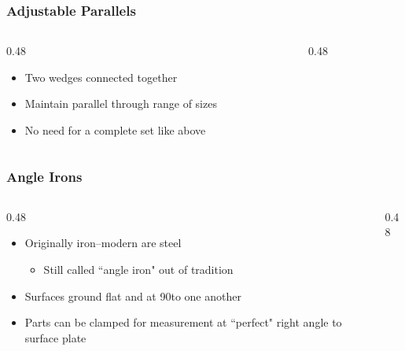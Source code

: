 \begin{frame}
	\frametitle{Adjustable Parallels}

    \begin{columns}
        \begin{column}{0.48\linewidth}
            \begin{itemize}[<+- | alert@+>]
                \item Two wedges connected together
                \item Maintain parallel through range of sizes
                \item No need for a complete set like above
            \end{itemize}
        \end{column}
        \begin{column}{0.48\linewidth}
            \resizebox{\linewidth}{!}{
                
            }
        \end{column}
    \end{columns}
\end{frame}

\begin{frame}
	\frametitle{Angle Irons}

    \begin{columns}
        \begin{column}{0.48\linewidth}
            \begin{itemize}[<+- | alert@+>]
                \item Originally iron--modern are steel
                    \begin{itemize}
                        \item Still called ``angle iron" out of tradition
                    \end{itemize}
                \item Surfaces ground flat and at 90\textdegree to one another
                \item Parts can be clamped for measurement at ``perfect" right angle to surface plate
            \end{itemize}
        \end{column}
        \begin{column}{0.48\linewidth}
        \end{column}
    \end{columns}
\end{frame}

